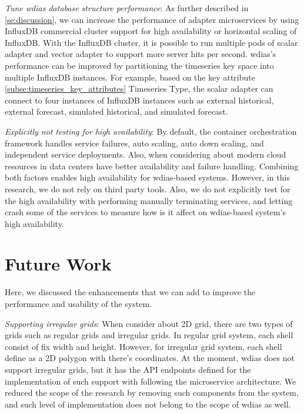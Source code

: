 \emph{Tune \acrshort{wdias} database structure performance}:
As further described in \cref{se:discussion}, we can increase the performance of adapter microservices by using InfluxDB commercial cluster support for high availability or horizontal scaling of InfluxDB. With the InfluxDB cluster, it is possible to run multiple pods of scalar adapter and vector adapter to support more server hits per second. \acrshort{wdias}'s performance can be improved by partitioning the timeseries key space into multiple InfluxDB instances. For example, based on the key attribute \cref{subse:timeseries_key_attributes} Timeseries Type, the scalar adapter can connect to four instances of InfluxDB instances such as external historical, external forecast, simulated historical, and simulated forecast.

\emph{Explicitly not testing for high availability}:
By default, the container orchestration framework handles service failures, auto scaling, auto down scaling, and independent service deployments. Also, when considering about modern cloud resources in data centers have better availability and failure handling. Combining both factors enables high availability for \acrshort{wdias}-based systems. However, in this research, we do not rely on third party tools. Also, we do not explicitly test for the high availability with performing manually terminating services, and letting crash some of the services to measure how is it affect on \acrshort{wdias}-based system's high availability.

\section{Future Work}
\label{se:future_work}
Here, we discussed the enhancements that we can add to improve the performance and usability of the system.

\emph{Supporting irregular grids}:
When consider about 2D grid, there are two types of grids such as regular grids and irregular grids. In regular grid system, each shell consist of fix width and height. However, for irregular grid system, each shell define as a 2D polygon with there's coordinates. 
At the moment, \acrshort{wdias} does not support irregular grids, but it has the API endpoints defined for the implementation of such support with following the microservice architecture. We reduced the scope of the research by removing such components from the system, and such level of implementation does not belong to the scope of \acrshort{wdias} as well.

